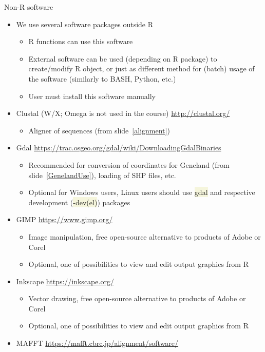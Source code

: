 \documentclass[compress, xelatex, 11pt, xcolor=svgnames, aspectratio=169,
	hyperref={
		bookmarks=true,
		unicode=true,
		colorlinks=true,
		pdftitle={Molecular data in R},
		plainpages=false,
		pdfauthor={Vojtech Zeisek},
		pdfsubject={Course about phylogeny and evolution in R},
		pdfcreator={XeLaTeX},
		pdfkeywords={R, evolution, phylogeny, molecular data},
		linkcolor=Crimson, %
		anchorcolor=Magenta, %
		citecolor=Magenta, %
		filecolor=Magenta, %
		menucolor=Magenta, %
		urlcolor=DodgerBlue, %
		},
	url={hyphens, lowtilde} %
	]{beamer}
\renewcommand{\texttt}[1]{\colorbox{Beige}{{\ttfamily #1}}}
\begin{document}
\begin{frame}[allowframebreaks]{Non-R software}
	\begin{itemize}
		\item We use several software packages outside R
		\begin{itemize}
			\item R functions can use this software
			\item External software can be used (depending on R package) to create/modify R object, or just as different method for (batch) usage of the software (similarly to BASH, Python, etc.)
			\item User must install this software manually
		\end{itemize}
		\item Clustal (W/X; Omega is not used in the course) \url{http://clustal.org/}
		\begin{itemize}
			\item Aligner of sequences (from slide~\ref{alignment})
		\end{itemize}
		\item Gdal \url{https://trac.osgeo.org/gdal/wiki/DownloadingGdalBinaries}
		\begin{itemize}
			\item Recommended for conversion of coordinates for Geneland (from slide~\ref{GenelandUse}), loading of SHP files, etc.
			\item Optional for Windows users, Linux users should use \texttt{gdal} and respective development (\texttt{-dev(el)}) packages
		\end{itemize}
		\item GIMP \url{https://www.gimp.org/}
		\begin{itemize}
			\item Image manipulation, free open-source alternative to products of Adobe or Corel
			\item Optional, one of possibilities to view and edit output graphics from R
		\end{itemize}
		\item Inkscape \url{https://inkscape.org/}
		\begin{itemize}
			\item Vector drawing, free open-source alternative to products of Adobe or Corel
			\item Optional, one of possibilities to view and edit output graphics from R
		\end{itemize}
		\item MAFFT \url{https://mafft.cbrc.jp/alignment/software/}

\end{itemize}
\end{frame}
\end{document}

